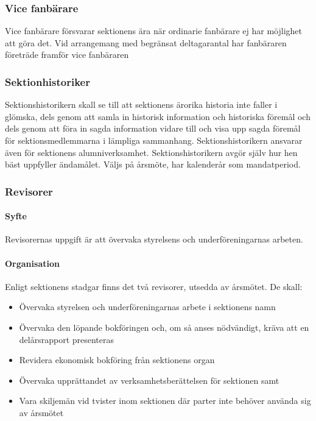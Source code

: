 \documentclass{../resources/dgovdoc}
\begin{document}
\subsubsection{Vice fanbärare}

Vice fanbärare försvarar sektionens ära när ordinarie fanbärare ej har möjlighet att göra det. 
Vid arrangemang med begränsat deltagarantal har fanbäraren företräde framför vice fanbäraren

\subsubsection{Sektionhistoriker}

Sektionshistorikern skall se till att sektionens ärorika historia inte faller i glömska, dels genom att samla in historisk information och historiska föremål och dels genom att föra in sagda information vidare till och visa upp sagda föremål för sektionsmedlemmarna i lämpliga sammanhang. 
Sektionshistorikern ansvarar även för sektionens alumniverksamhet. 
Sektionshistorikern avgör själv hur hen bäst uppfyller ändamålet. Väljs på årsmöte, har kalenderår som mandatperiod. 

\subsubsection{Revisorer}

\paragraph{Syfte}

Revisorernas uppgift är att övervaka styrelsens och underföreningarnas arbeten.

\paragraph{Organisation}

Enligt sektionens stadgar finns det två revisorer, utsedda av årsmötet. De skall:

\begin{itemize}
\item Övervaka styrelsen och underföreningarnas arbete i sektionens namn
\item Övervaka den löpande bokföringen och, om så anses nödvändigt, kräva att en delårsrapport presenteras
\item Revidera ekonomisk bokföring från sektionens organ
\item Övervaka upprättandet av verksamhetsberättelsen för sektionen samt 
\item Vara skiljemän vid tvister inom sektionen där parter inte behöver använda sig av årsmötet
\end{itemize}
\end{document}
